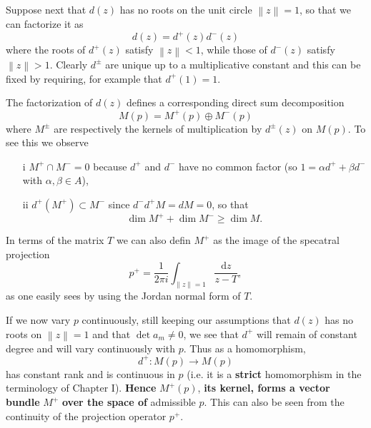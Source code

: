\documentclass[leqno]{book}
\numberwithin{equation}{section}
\theoremstyle{definition}
\renewcommand{\emph}{\textbf}
\begin{document}
            Suppose next that $d(z)$ has no roots on the unit circle $\left\| z \right\|=1$, so that we can factorize it as
            \begin{equation*}
              d(z)=d^{+}(z)d^{-}(z)
            \end{equation*}
            where the roots of $d^{+}(z)$ satisfy $\left\| z \right\|<1$, while those of $d^{-}(z)$ satisfy $\left\| z \right\|>1$. Clearly $d^{\pm}$ are unique up to a multiplicative constant and this can be fixed by requiring, for example that $d^{+}(1)=1$.

            The factorization of $d(z)$ defines a corresponding direct sum decomposition
            \begin{equation*}
              \tag{2.3.2}
              M(p)=M^{+}(p)\oplus M^{-}(p)
            \end{equation*}
            where $M^{\pm}$ are respectively the kernels of multiplication by $d^{\pm}(z)$ on $M(p)$. To see this we observe
            \begin{itemize}
              \item[i] $M^{+}\cap M^{-}=0$ because $d^{+}$ and $d^{-}$ have no common factor (so $1=\alpha d^{+}+\beta d^{-}$ with $\alpha,\beta \in A$),
              \item[ii] $d^{+}(M^{+})\subset M^{-}$ since $d^{-}d^{+}M=dM=0$, so that \begin{equation*}
                \operatorname{dim} M^{+}+\operatorname{dim} M^{-}\ge \operatorname{dim} M.
              \end{equation*}
            \end{itemize}

            In terms of the matrix $T$ we can also defin $M^{+}$ as the image of the specatral projection
            \begin{equation*}
              p^{+}=\frac{1}{2\pi i}\int_{\left\| z \right\|=1} \frac{\mathrm{d}z}{z-T},
            \end{equation*}
            as one easily sees by using the Jordan normal form of $T$.

            If we now vary $p$ continuously, still keeping our assumptions that $d(z)$ has no roots on $\left\| z \right\|=1$ and that $\det a_{m}\neq 0$, we see that $d^{+}$ will remain of constant degree and will vary continuously with $p$. Thus as a homomorphism,
            \begin{equation*}
              d^{+}:M(p)\to M(p)
            \end{equation*}
            has constant rank and is continuous in $p$ (i.e. it is a \emph{strict} homomorphism in the terminology of Chapter I). \emph{Hence} $M^{+}(p)$, \emph{its kernel, forms a vector bundle} $M^{+}$ \emph{over the space of} admissible $p$. This can also be seen from the continuity of the projection operator $p^{+}$.
\end{document}
